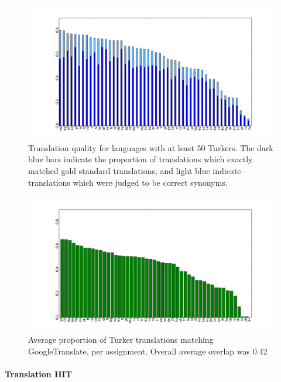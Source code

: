 \documentclass[11pt]{article}
\begin{document}
\begin{figure}[h]
\begin{center}
\includegraphics[width=0.8\linewidth]{final-figures/quality-bar}
\caption{Translation quality for languages with at least 50 Turkers.  The dark blue bars indicate the proportion of translations which exactly matched gold standard translations, and light blue indicate translations which were judged to be correct synonyms.}
\label{hitlangqual} 
\end{center}
\end{figure}

\begin{figure}[h]
\begin{center}
\includegraphics[width=0.8\linewidth]{final-figures/google-match}
\caption{Average proportion of Turker translations matching GoogleTranslate, per assignment. Overall average overlap was 0.42}
\label{googlematch} 
\end{center}
\end{figure}



\paragraph{Translation HIT}
\end{document}
